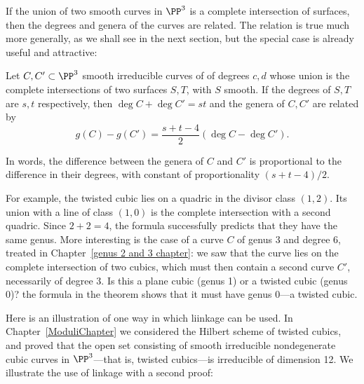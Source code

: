 If the union of two smooth curves in $\PP^3$ is a complete intersection of surfaces, then the degrees and genera
of the curves are related. The relation is true much more generally, as we shall see in the next section, but the special
case is already useful and attractive:

\begin{theorem}\label{liaison genus formula-first version} Let $C, {C'}\subset \PP^3$ smooth irreducible curves of  of degrees $c,d$ whose union is the complete intersections of two surfaces $S,T$, with $S$ smooth. If the degrees of $S,T$ are $s,t$ respectively, then $\deg C+\deg C' = st$ and the genera of $C,C'$ are
related by
 $$
 g(C) - g({C'}) = \frac{s+t-4}{2}(\deg C-\deg {C'}).
 $$
\end{theorem}
In words, the difference between the genera of $C$ and ${C'}$ is proportional to the difference in their degrees, with constant of proportionality $(s+t-4)/2$.

For example, the twisted cubic lies on a quadric in the divisor class $(1,2)$. Its union with a line of class $(1,0)$ is the complete intersection with
a second quadric. Since $2+2=4$, the formula successfully predicts that they have the same genus. More interesting is the case of
a curve $C$ of genus 3 and degree 6, treated in Chapter~\ref{genus 2 and 3 chapter}: we saw that the curve lies on the complete intersection of
two cubics, which must then contain a second curve $C'$, necessarily of degree $3$. Is this a plane cubic (genus 1) or a twisted cubic (genus 0)?
the formula in the theorem shows that it must have genus 0---a twisted cubic.

Here is an illustration of one way in which liinkage can be used.
In Chapter~\ref{ModuliChapter} we considered the Hilbert scheme of twisted cubics, and proved that the open set consisting of 
smooth irreducible nondegenerate cubic curves in $\PP^3$---that is, twisted cubics---is irreducible of
dimension 12. We illustrate the use of linkage with a second proof:

